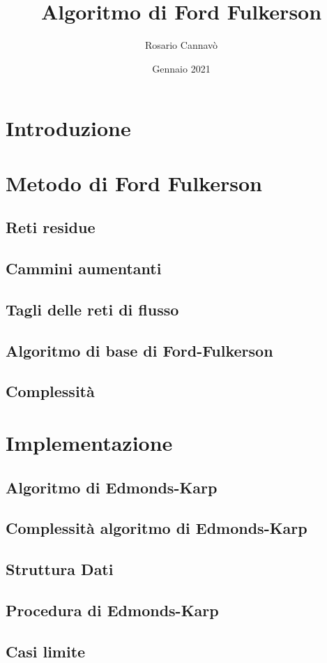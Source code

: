 \documentclass{article}
\title{Algoritmo di Ford Fulkerson}
\author{Rosario Cannavò }
\date{Gennaio 2021}
\begin{document}
\maketitle

\section{Introduzione}
\section{Metodo di Ford Fulkerson}
\subsection{Reti residue}
\subsection{Cammini aumentanti}
\subsection{Tagli delle reti di flusso}
\subsection{Algoritmo di base di Ford-Fulkerson}
\subsection{Complessità}
\section{Implementazione}
\subsection{Algoritmo di Edmonds-Karp}
\subsection{Complessità algoritmo di Edmonds-Karp}
\subsection{Struttura Dati}
\subsection{Procedura di Edmonds-Karp}
\subsection{Casi limite}
\end{document}
